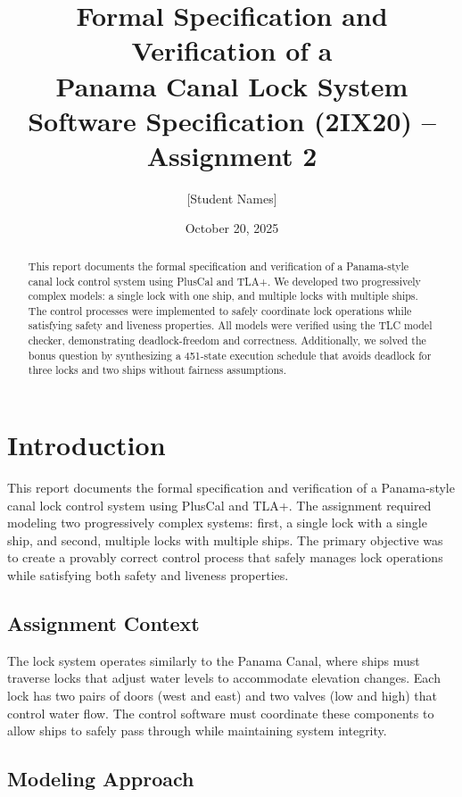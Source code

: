 \documentclass[12pt,a4paper]{article}
\title{\textbf{Formal Specification and Verification of a\\Panama Canal Lock System}\\
\large Software Specification (2IX20) -- Assignment 2}
\author{[Student Names]\\
[Student IDs]}
\date{October 20, 2025}
\begin{document}
\maketitle

\begin{abstract}
This report documents the formal specification and verification of a Panama-style canal lock control system using PlusCal and TLA+. We developed two progressively complex models: a single lock with one ship, and multiple locks with multiple ships. The control processes were implemented to safely coordinate lock operations while satisfying safety and liveness properties. All models were verified using the TLC model checker, demonstrating deadlock-freedom and correctness. Additionally, we solved the bonus question by synthesizing a 451-state execution schedule that avoids deadlock for three locks and two ships without fairness assumptions.
\end{abstract}

\tableofcontents
\newpage

\section{Introduction}

This report documents the formal specification and verification of a Panama-style canal lock control system using PlusCal and TLA+. The assignment required modeling two progressively complex systems: first, a single lock with a single ship, and second, multiple locks with multiple ships. The primary objective was to create a provably correct control process that safely manages lock operations while satisfying both safety and liveness properties.

\subsection{Assignment Context}

The lock system operates similarly to the Panama Canal, where ships must traverse locks that adjust water levels to accommodate elevation changes. Each lock has two pairs of doors (west and east) and two valves (low and high) that control water flow. The control software must coordinate these components to allow ships to safely pass through while maintaining system integrity.

\subsection{Modeling Approach}
\end{document}
